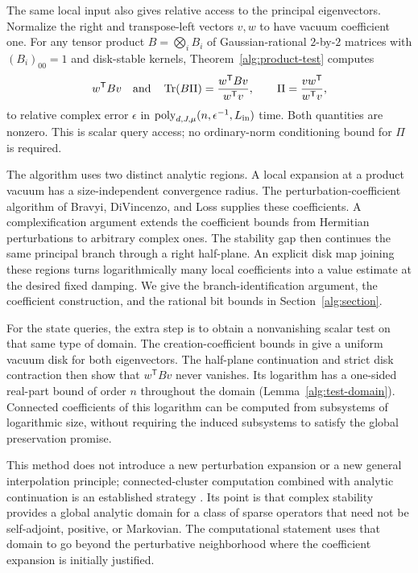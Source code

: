 \documentclass[reqno]{amsart}
\theoremstyle{definition}
\theoremstyle{remark}
\DeclareMathOperator{\Tr}{Tr}
\begin{document}
The same local input also gives relative access to the principal
eigenvectors. Normalize the right and transpose-left vectors $v,w$
to have vacuum coefficient one. For any tensor product $B=\bigotimes_iB_i$
of Gaussian-rational $2$-by-$2$ matrices with $(B_i)_{00}=1$ and
disk-stable kernels, Theorem~\ref{alg:product-test} computes
\[
 w^{\mathsf T}Bv
 \quad\hbox{and}\quad
 \Tr(B\Pi)=\frac{w^{\mathsf T}Bv}{w^{\mathsf T}v},
 \qquad \Pi=\frac{vw^{\mathsf T}}{w^{\mathsf T}v},
\]
to relative complex error $\epsilon$ in
$\operatorname{poly}_{d,J,\mu}(n,\epsilon^{-1},L_{\rm in})$ time.
Both quantities are nonzero. This is scalar query access; no
ordinary-norm conditioning bound for $\Pi$ is required.

The algorithm uses two distinct analytic regions. A local expansion
at a product vacuum has a size-independent convergence radius.
The perturbation-coefficient algorithm of Bravyi, DiVincenzo, and
Loss \cite{BDL08} supplies these coefficients. A complexification
argument extends the coefficient bounds from Hermitian perturbations
to arbitrary complex ones. The stability gap then continues the same
principal branch through a right half-plane. An explicit disk map
joining these regions turns logarithmically many local coefficients
into a value estimate at the desired fixed damping. We give the
branch-identification argument, the coefficient construction, and the
rational bit bounds in Section~\ref{alg:section}.

For the state queries, the extra step is to obtain a nonvanishing
scalar test on that same type of domain. The creation-coefficient
bounds in \cite{BDL08} give a uniform vacuum disk for both eigenvectors.
The half-plane continuation and strict disk contraction then show
that $w^{\mathsf T}Bv$ never vanishes. Its logarithm has a one-sided
real-part bound of order $n$ throughout the domain
(Lemma~\ref{alg:test-domain}). Connected coefficients of this logarithm
can be computed from subsystems of logarithmic size, without requiring
the induced subsystems to satisfy the global preservation promise.

This method does not introduce a new perturbation expansion or a new
general interpolation principle; connected-cluster computation combined
with analytic continuation is an established strategy
\cite{PatelRegts17,YYZ22,WildAlhambra23}.
Its point is that complex stability
provides a global analytic domain for a class of sparse operators that
need not be self-adjoint, positive, or Markovian. The computational
statement uses that domain to go beyond the perturbative neighborhood
where the coefficient expansion is initially justified.
\end{document}
